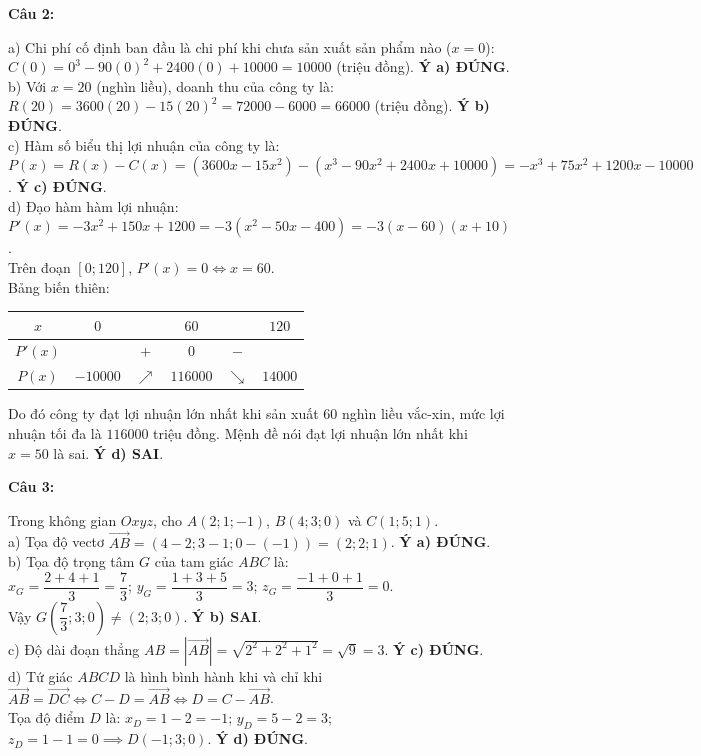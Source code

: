 \documentclass[12pt,a4paper]{article}
\newcommand{\loigiai}[1]{\par\medskip\Needspace{4\baselineskip}\noindent\textbf{#1}\par\nobreak}
\begin{document}
\loigiai{Câu 2:}
a) Chi phí cố định ban đầu là chi phí khi chưa sản xuất sản phẩm nào ($x=0$):\\
$C(0)=0^3-90(0)^2+2400(0)+10000=10000$ (triệu đồng). \textbf{Ý a) ĐÚNG}.\\
b) Với $x=20$ (nghìn liều), doanh thu của công ty là:\\
$R(20)=3600(20)-15(20)^2=72000-6000=66000$ (triệu đồng). \textbf{Ý b) ĐÚNG}.\\
c) Hàm số biểu thị lợi nhuận của công ty là:\\
$P(x)=R(x)-C(x)=(3600x-15x^2)-(x^3-90x^2+2400x+10000)=-x^3+75x^2+1200x-10000$. \textbf{Ý c) ĐÚNG}.\\
d) Đạo hàm hàm lợi nhuận:\\
$P'(x)=-3x^2+150x+1200=-3(x^2-50x-400)=-3(x-60)(x+10)$.\\
Trên đoạn $[0;120]$, $P'(x)=0 \iff x=60$.\\
Bảng biến thiên:\\
\begin{center}
\begin{tabular}{c|ccccc}
$x$ & $0$ & & $60$ & & $120$ \\\hline
$P'(x)$ & & $+$ & $0$ & $-$ & \\\hline
$P(x)$ & $-10000$ & $\nearrow$ & $116000$ & $\searrow$ & $14000$
\end{tabular}
\end{center}
Do đó công ty đạt lợi nhuận lớn nhất khi sản xuất $60$ nghìn liều vắc-xin, mức lợi nhuận tối đa là $116000$ triệu đồng. Mệnh đề nói đạt lợi nhuận lớn nhất khi $x=50$ là sai. \textbf{Ý d) SAI}.

\loigiai{Câu 3:}
Trong không gian $Oxyz$, cho $A(2;1;-1)$, $B(4;3;0)$ và $C(1;5;1)$.\\
a) Tọa độ vectơ $\vec{AB}=(4-2;3-1;0-(-1))=(2;2;1)$. \textbf{Ý a) ĐÚNG}.\\
b) Tọa độ trọng tâm $G$ của tam giác $ABC$ là:\\
$x_G=\dfrac{2+4+1}{3}=\dfrac{7}{3}$; \quad $y_G=\dfrac{1+3+5}{3}=3$; \quad $z_G=\dfrac{-1+0+1}{3}=0$.\\
Vậy $G\left(\dfrac{7}{3};3;0\right)\ne (2;3;0)$. \textbf{Ý b) SAI}.\\
c) Độ dài đoạn thẳng $AB=|\vec{AB}|=\sqrt{2^2+2^2+1^2}=\sqrt{9}=3$. \textbf{Ý c) ĐÚNG}.\\
d) Tứ giác $ABCD$ là hình bình hành khi và chỉ khi $\vec{AB}=\vec{DC} \iff C-D=\vec{AB} \iff D=C-\vec{AB}$.\\
Tọa độ điểm $D$ là: $x_D=1-2=-1$; $y_D=5-2=3$; $z_D=1-1=0 \implies D(-1;3;0)$. \textbf{Ý d) ĐÚNG}.
\end{document}
